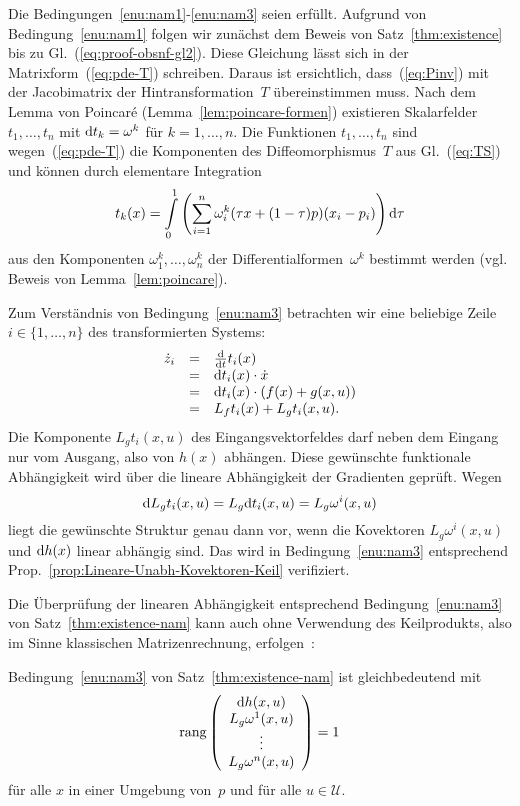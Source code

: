 \begin{svmultproof2}
Die Bedingungen~\ref{enu:nam1}-\ref{enu:nam3} seien erfüllt. Aufgrund
von Bedingung~\ref{enu:nam1} folgen wir zunächst dem Beweis von
Satz~\ref{thm:existence} bis zu Gl.~(\ref{eq:proof-obsnf-gl2}).
Diese Gleichung lässt sich in der Matrixform~(\ref{eq:pde-T}) schreiben.
Daraus ist ersichtlich, dass~(\ref{eq:Pinv}) mit der Jacobimatrix
der Hintransformation~$T$ übereinstimmen muss. Nach dem Lemma von
Poincaré (Lemma~\ref{lem:poincare-formen})
existieren Skalarfelder $t_{1},\ldots,t_{n}$ mit ${\mathrm{d}} t_{k}=\omega^{k}$
für $k=1,\ldots,n$. Die Funktionen $t_{1},\ldots,t_{n}$ sind wegen~(\ref{eq:pde-T})
die Komponenten des Diffeomorphismus~$T$ aus Gl.~(\ref{eq:TS})
und können durch elementare Integration 
\[
t_{k}(x)=\int\limits _{0}^{1}\left(\sum_{i=1}^{n}\omega_{i}^{k}(\tau x+(1-\tau)p)(x_{i}-p_{i})\right){\mathrm{d}}\tau
\]
aus den Komponenten $\omega_{1}^{k},\ldots,\omega_{n}^{k}$ der Differentialformen~$\omega^{k}$
bestimmt werden (vgl. Beweis von Lemma~\ref{lem:poincare}).

Zum Verständnis von Bedingung~\ref{enu:nam3} betrachten wir eine
beliebige Zeile $i\in\{1,\ldots,n\}$ des transformierten Systems:
\[
\begin{array}{lcl}
\dot{z}_{i} & = & \frac{{\mathrm{d}}}{{\mathrm{d}} t}t_{i}(x)\\
 & = & {\mathrm{d}} t_{i}(x)\cdot\dot{x}\\
 & = & {\mathrm{d}} t_{i}(x)\cdot\left(f(x)+g(x,u)\right)\\
 & = & L_{f}t_{i}(x)+L_{g}t_{i}(x,u).
\end{array}
\]
Die Komponente $L_{g}t_{i}(x,u)$ des Eingangsvektorfeldes darf neben
dem Eingang nur vom Ausgang, also von $h(x)$ abhängen. Diese gewünschte
funktionale Abhängigkeit wird über die lineare Abhängigkeit der Gradienten
geprüft. Wegen
\[
{\mathrm{d}} L_{g}t_{i}(x,u)=L_{g}{\mathrm{d}} t_{i}(x,u)=L_{g}\omega^{i}(x,u)
\]
liegt die gewünschte Struktur genau dann vor, wenn die Kovektoren
$L_{g}\omega^{i}(x,u)$ und ${\mathrm{d}} h(x)$ linear abhängig sind. Das wird
in Bedingung~\ref{enu:nam3} entsprechend Prop.~\ref{prop:Lineare-Unabh-Kovektoren-Keil}
verifiziert.
\end{svmultproof2}

Die Überprüfung der linearen Abhängigkeit entsprechend Bedingung~\ref{enu:nam3}
von Satz~\ref{thm:existence-nam} kann auch ohne Verwendung des Keilprodukts,
also im Sinne klassischen Matrizenrechnung, erfolgen~\cite[Corollary~1]{nam97}:
\begin{corollary}
Bedingung~\ref{enu:nam3} von Satz~\ref{thm:existence-nam} ist
gleichbedeutend mit
\[
{\operatorname{rang}}\left(\begin{array}{c}
{\mathrm{d}} h(x,u)\\
L_{g}\omega^{1}(x,u)\\
\vdots\\
L_{g}\omega^{n}(x,u)
\end{array}\right)=1
\]
für alle $x$ in einer Umgebung von~$p$ und für alle $u\in\mathcal{U}$.
\end{corollary}

